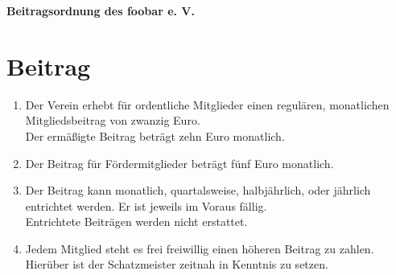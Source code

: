\documentclass[10pt,a4paper]{scrartcl}
\begin{document}
\noindent
{\huge\bfseries Beitragsordnung des foobar e. V.}


\section{Beitrag}

\begin{enumerate}[label=\bfseries (\arabic*)] 
\item
  Der Verein erhebt für ordentliche Mitglieder einen regulären, monatlichen
  Mitgliedsbeitrag von zwanzig Euro.\\
  Der ermäßigte Beitrag beträgt zehn Euro monatlich.
\item
  Der Beitrag für Fördermitglieder beträgt fünf Euro monatlich.
\item
  Der Beitrag kann monatlich, quartalsweise, halbjährlich, oder jährlich entrichtet werden.
  Er ist jeweils im Voraus fällig.\\
  Entrichtete Beiträgen werden nicht erstattet.
\item
  Jedem Mitglied steht es frei freiwillig einen höheren Beitrag zu zahlen.\\
  Hierüber ist der Schatzmeister zeitnah in Kenntnis zu setzen.
\end{enumerate}
\end{document}
